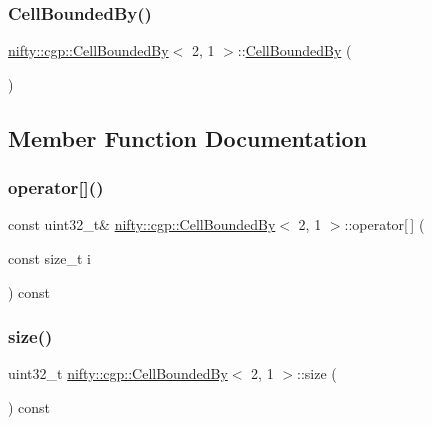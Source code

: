 \subsubsection{\texorpdfstring{Cell\+Bounded\+By()}{CellBoundedBy()}}
{\footnotesize\ttfamily \hyperlink{classnifty_1_1cgp_1_1CellBoundedBy}{nifty\+::cgp\+::\+Cell\+Bounded\+By}$<$ 2, 1 $>$\+::\hyperlink{classnifty_1_1cgp_1_1CellBoundedBy}{Cell\+Bounded\+By} (\begin{DoxyParamCaption}{ }\end{DoxyParamCaption})\hspace{0.3cm}{\ttfamily [inline]}}



\subsection{Member Function Documentation}
\mbox{\label{classnifty_1_1cgp_1_1CellBoundedBy_3_012_00_011_01_4_ad2f6cdd4927b4f2f635842258d12b6b3}} 
\subsubsection{\texorpdfstring{operator[]()}{operator[]()}}
{\footnotesize\ttfamily const uint32\+\_\+t\& \hyperlink{classnifty_1_1cgp_1_1CellBoundedBy}{nifty\+::cgp\+::\+Cell\+Bounded\+By}$<$ 2, 1 $>$\+::operator\mbox{[}$\,$\mbox{]} (\begin{DoxyParamCaption}\item[{const size\+\_\+t}]{i }\end{DoxyParamCaption}) const\hspace{0.3cm}{\ttfamily [inline]}}

\mbox{\label{classnifty_1_1cgp_1_1CellBoundedBy_3_012_00_011_01_4_a4f4b57ee7dd61e28ea8a937a55d03def}} 
\subsubsection{\texorpdfstring{size()}{size()}}
{\footnotesize\ttfamily uint32\+\_\+t \hyperlink{classnifty_1_1cgp_1_1CellBoundedBy}{nifty\+::cgp\+::\+Cell\+Bounded\+By}$<$ 2, 1 $>$\+::size (\begin{DoxyParamCaption}{ }\end{DoxyParamCaption}) const\hspace{0.3cm}{\ttfamily [inline]}}



